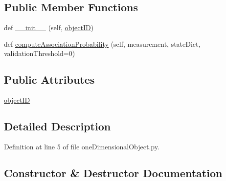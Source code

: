 \subsection*{Public Member Functions}
\begin{DoxyCompactItemize}
\item 
def \hyperlink{classmodest_1_1signals_1_1oneDimensionalObject_1_1oneDObjectMeasurement_aa7849d9c570738c30e90b37c975cc329}{\+\_\+\+\_\+init\+\_\+\+\_\+} (self, \hyperlink{classmodest_1_1signals_1_1oneDimensionalObject_1_1oneDObjectMeasurement_a998f41f9e1ef63fc336f4c1d52c1aa4b}{object\+ID})
\item 
def \hyperlink{classmodest_1_1signals_1_1oneDimensionalObject_1_1oneDObjectMeasurement_a357fb9341c6c3b09864cf24b038936bd}{compute\+Association\+Probability} (self, measurement, state\+Dict, validation\+Threshold=0)
\end{DoxyCompactItemize}
\subsection*{Public Attributes}
\begin{DoxyCompactItemize}
\item 
\hyperlink{classmodest_1_1signals_1_1oneDimensionalObject_1_1oneDObjectMeasurement_a998f41f9e1ef63fc336f4c1d52c1aa4b}{object\+ID}
\end{DoxyCompactItemize}


\subsection{Detailed Description}


Definition at line 5 of file one\+Dimensional\+Object.\+py.



\subsection{Constructor \& Destructor Documentation}

